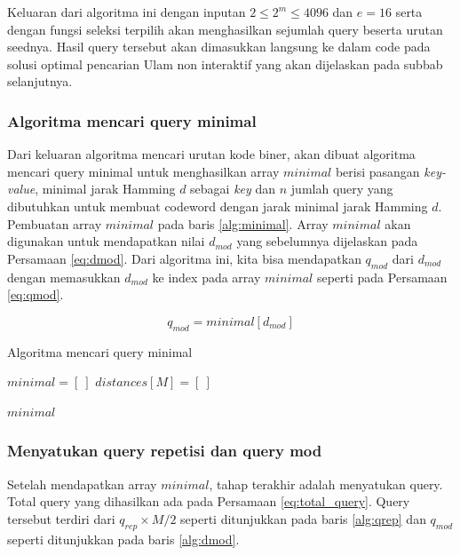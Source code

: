 Keluaran dari algoritma ini dengan inputan $2 \leq 2^m \leq 4096$ dan $e=16$ serta dengan fungsi seleksi terpilih akan menghasilkan sejumlah query beserta urutan seednya. Hasil query tersebut akan dimasukkan langsung ke dalam code pada solusi optimal pencarian Ulam non interaktif yang akan dijelaskan pada subbab selanjutnya.

\subsubsection{Algoritma mencari query minimal}

Dari keluaran algoritma mencari urutan kode biner, akan dibuat algoritma mencari query minimal untuk menghasilkan array $minimal$ berisi pasangan \textit{key-value}, minimal jarak Hamming $d$ sebagai \textit{key} dan $n$ jumlah query yang dibutuhkan untuk membuat codeword dengan jarak minimal jarak Hamming $d$. Pembuatan array $minimal$ pada baris \ref{alg:minimal}. Array $minimal$ akan digunakan untuk mendapatkan nilai $d_{mod}$ yang sebelumnya dijelaskan pada Persamaan \ref{eq:dmod}. Dari algoritma ini, kita bisa mendapatkan $q_{mod}$ dari $d_{mod}$ dengan memasukkan $d_{mod}$ ke index pada array $minimal$ seperti pada Persamaan \ref{eq:qmod}.

\begin{equation}
\label{eq:qmod}
q_{mod} = minimal[d_{mod}]
\end{equation}

\begin{algorithm}[h]
\caption{Algoritma mencari query minimal}
\label{alg:generate_minimal_query}
  $minimal = [\ ]$\;
  $distances[M] = [\ ]$\;

  \For{$i = 0$ \KwTo $M-1$}{
    $min = \infty$\;
    $query = \text{generate\_query}(M, code\_order[m][i])$\;
    update the $distances$ after $query$\;
    $min$ = min($distances$)\;
    $minimal[min] = i$\;\label{alg:minimal}
    \lIf{$min \geq d$}{break}
  }
  \Return $minimal$\;
\end{algorithm}

\subsubsection{Menyatukan query repetisi dan query mod}

Setelah mendapatkan array $minimal$, tahap terakhir adalah menyatukan query. Total query yang dihasilkan ada pada Persamaan \ref{eq:total_query}. Query tersebut terdiri dari $q_{rep} \times M/2$ seperti ditunjukkan pada baris \ref{alg:qrep} dan $q_{mod}$ seperti ditunjukkan pada baris \ref{alg:dmod}.

